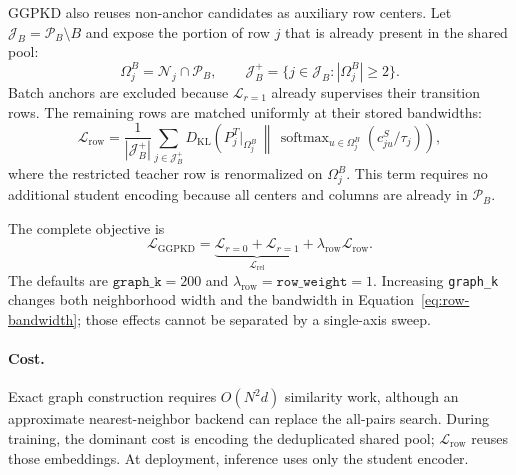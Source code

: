 GGPKD also reuses non-anchor candidates as auxiliary row centers. Let
$\mathcal J_B=\mathcal P_B\setminus B$ and expose the portion of row $j$ that is
already present in the shared pool:
\begin{equation}
\Omega_j^B=\mathcal N_j\cap\mathcal P_B,
\qquad
\mathcal J_B^+=\{j\in\mathcal J_B:|\Omega_j^B|\geq2\}.
\end{equation}
Batch anchors are excluded because $\mathcal L_{r=1}$ already supervises their
transition rows. The remaining rows are matched uniformly at their stored
bandwidths:
\begin{equation}
\mathcal L_{\mathrm{row}}
=\frac{1}{|\mathcal J_B^+|}\sum_{j\in\mathcal J_B^+}
D_{\mathrm{KL}}\!\left(
P_j^T\big|_{\Omega_j^B}
\,\middle\|\,
\operatorname{softmax}_{u\in\Omega_j^B}(c_{ju}^S/\tau_j)
\right),
\label{eq:row-loss}
\end{equation}
where the restricted teacher row is renormalized on $\Omega_j^B$. This term
requires no additional student encoding because all centers and columns are
already in $\mathcal P_B$.

The complete objective is
\begin{equation}
\mathcal L_{\mathrm{GGPKD}}
=\underbrace{\mathcal L_{r=0}+\mathcal L_{r=1}}_{\mathcal L_{\mathrm{rel}}}
+\lambda_{\mathrm{row}}\mathcal L_{\mathrm{row}}.
\label{eq:full-objective}
\end{equation}
The defaults are $\texttt{graph\_k}=200$ and
$\lambda_{\mathrm{row}}=\texttt{row\_weight}=1$. Increasing
\texttt{graph\_k} changes both neighborhood width and the bandwidth in
Equation~\eqref{eq:row-bandwidth}; those effects cannot be separated by a
single-axis sweep.

\paragraph{Cost.}
Exact graph construction requires $O(N^2d)$ similarity work, although an
approximate nearest-neighbor backend can replace the all-pairs search. During
training, the dominant cost is encoding the deduplicated shared pool;
$\mathcal L_{\mathrm{row}}$ reuses those embeddings. At deployment, inference
uses only the student encoder.
